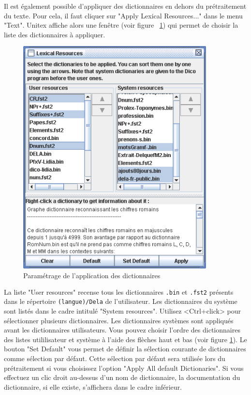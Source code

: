 \bigskip
\noindent Il est également possible d’appliquer des dictionnaires en dehors du prétraitement du
texte. Pour cela, il faut cliquer sur "Apply Lexical Resources..." dans le menu "Text". Unitex
affiche alors une fenêtre (voir figure ~\ref{fig-Dico-configuration}) qui permet de choisir la
liste des dictionnaires à appliquer.


\begin{figure}[!ht]
\begin{center}
\includegraphics[width=10cm]{resources/img/fig2-14.png}
\caption{Paramétrage de l’application des dictionnaires\label{fig-Dico-configuration}}
\end{center}
\end{figure}

\bigskip
\noindent La liste "User resources" recense tous les dictionnaires \verb+.bin+ et \verb+.fst2+
présents dans le répertoire \verb+(langue)/Dela+ de l’utilisateur. Les dictionnaires du système sont
listés dans le cadre intitulé "System resources". Utilisez <Ctrl+click> pour sélectionner plusieurs
dictionnaires. Les dictionnaires systèmes sont appliqués avant les dictionnaires utilisateurs.
Vous pouvez choisir l'ordre des dictionnaires des listes utililisateur et système à l'aide des
flèches haut et bas (voir figure \ref{fig-Dico-configuration}). Le bouton "Set Default" vous permet
de définir la sélection courante de dictionnaires comme sélection par défaut. Cette sélection par
défaut sera utilisée lors du prétraitement si vous choisissez l’option "Apply All default
Dictionaries".
Si vous effectuez un clic droit au-dessus d’un nom de dictionnaire, la documentation du
dictionnaire, si elle existe, s’affichera dans le cadre inférieur.


